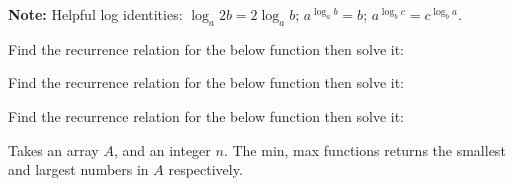 \vspace{-.5em}
\begin{Note}
    \textbf{Note:} Helpful log identities: $\log_a 2b = 2\log_a b$; $a^{\log_a b} = b$; $a^{\log_b c} = c^{\log_b a}$.
\end{Note}

\begin{Exercise} Find the recurrence relation for the below function then solve it:
\end{Exercise}

\vspace{-.5em}
\begin{Func}

    \vspace{-1em}
    \begin{algorithm}[H]
    \end{algorithm}
\end{Func}

\vspace{-.5em}
\begin{Exercise} Find the recurrence relation for the below function then solve it:
\end{Exercise}

\vspace{-.5em}
\begin{Func}

    \vspace{-1em}
    \begin{algorithm}[H]
    \end{algorithm}
\end{Func}

\vspace{-.5em}
\begin{Exercise} Find the recurrence relation for the below function then solve it:
\end{Exercise}

\vspace{-.5em}
\begin{Func}

    \vspace{-1em}
    Takes an array $A$, and an integer $n$. The min, max functions
    returns the smallest and largest numbers in $A$ respectively.\\
    \begin{algorithm}[H]
    \end{algorithm}
\end{Func}

